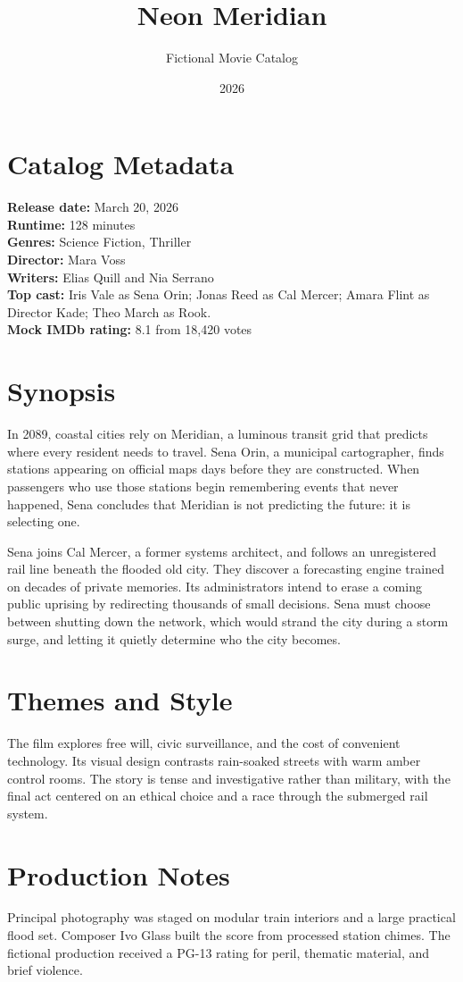 \documentclass[11pt]{article}
\title{Neon Meridian}
\author{Fictional Movie Catalog}
\date{2026}
\begin{document}
\maketitle

\section*{Catalog Metadata}
\textbf{Release date:} March 20, 2026\\
\textbf{Runtime:} 128 minutes\\
\textbf{Genres:} Science Fiction, Thriller\\
\textbf{Director:} Mara Voss\\
\textbf{Writers:} Elias Quill and Nia Serrano\\
\textbf{Top cast:} Iris Vale as Sena Orin; Jonas Reed as Cal Mercer;
Amara Flint as Director Kade; Theo March as Rook.\\
\textbf{Mock IMDb rating:} 8.1 from 18,420 votes

\section*{Synopsis}
In 2089, coastal cities rely on Meridian, a luminous transit grid that predicts
where every resident needs to travel. Sena Orin, a municipal cartographer,
finds stations appearing on official maps days before they are constructed.
When passengers who use those stations begin remembering events that never
happened, Sena concludes that Meridian is not predicting the future: it is
selecting one.

Sena joins Cal Mercer, a former systems architect, and follows an unregistered
rail line beneath the flooded old city. They discover a forecasting engine
trained on decades of private memories. Its administrators intend to erase a
coming public uprising by redirecting thousands of small decisions. Sena must
choose between shutting down the network, which would strand the city during a
storm surge, and letting it quietly determine who the city becomes.

\section*{Themes and Style}
The film explores free will, civic surveillance, and the cost of convenient
technology. Its visual design contrasts rain-soaked streets with warm amber
control rooms. The story is tense and investigative rather than military, with
the final act centered on an ethical choice and a race through the submerged
rail system.

\section*{Production Notes}
Principal photography was staged on modular train interiors and a large
practical flood set. Composer Ivo Glass built the score from processed station
chimes. The fictional production received a PG-13 rating for peril, thematic
material, and brief violence.
\end{document}
